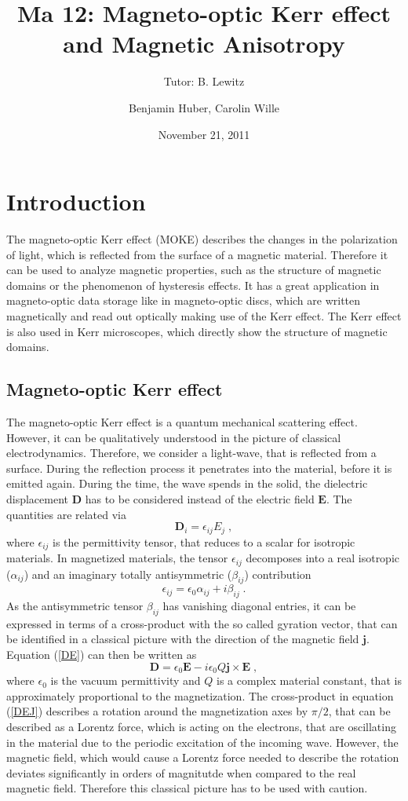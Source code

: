 \documentclass[a4paper]{scrartcl}
\title{Ma 12: Magneto-optic Kerr effect and Magnetic Anisotropy}
\subtitle{Tutor: B. Lewitz}
\author{Benjamin Huber, Carolin Wille}
\date{November 21, 2011}
\numberwithin{equation}{section}
\numberwithin{figure}{section}
\numberwithin{table}{section}
\newcommand{\eq}[2]{\begin{equation}#1\label{#2}\end{equation}}
\newcommand{\Formel}[1]{(\ref{#1})}
\newcommand{\ve}[1]{\mathbf{ #1} }
\begin{document}
\thispagestyle{empty}
\maketitle
\tableofcontents
\clearpage


\section{Introduction}
The magneto-optic Kerr effect (MOKE) describes the changes in the polarization of light, which is reflected from the surface of a magnetic material. Therefore it can be used to analyze magnetic properties, such as the structure of magnetic domains or the phenomenon of hysteresis effects. It has a great application in magneto-optic data storage like in magneto-optic discs, which are written magnetically and read out optically making use of the Kerr effect. The Kerr effect is also used in Kerr microscopes, which directly show the structure of magnetic domains.

\subsection{Magneto-optic Kerr effect}
The magneto-optic Kerr effect is a quantum mechanical scattering effect. However, it can be qualitatively understood in the picture of classical electrodynamics. Therefore, we consider a light-wave, that is reflected from a surface. During the reflection process it
 penetrates into the material, before it is emitted again. During the time, the wave spends in the solid, the dielectric displacement $\ve D $ has to be considered instead of the electric field $\ve E$. The quantities are related via
\eq{\ve D_i = \epsilon_{ij} E_j \;, } {DE}
where $ \epsilon_{ij}$ is the permittivity tensor, that reduces to a scalar for isotropic materials. In magnetized materials, the tensor $\epsilon_{ij}$ decomposes into a real isotropic ($\alpha_{ij}$) and an imaginary totally antisymmetric ($\beta_{ij}$) contribution
\eq{\epsilon_{ij} = \epsilon_0 \alpha_{ij} + i \beta_{ij} \; . }{eps}
As the antisymmetric tensor $\beta_{ij}$ has vanishing diagonal entries, it can be expressed in terms of a cross-product with the so called gyration vector, that can be identified in a classical picture with the direction of the magnetic field $\ve j$. Equation \Formel{DE} can then be written as
\eq{\ve D = \epsilon_0 \ve E - i \epsilon_0 Q \ve j \times \ve E \; , }{DEJ}
where $\epsilon_0$ is the vacuum permittivity and $Q$ is a complex material constant, that is approximately proportional to the magnetization. The cross-product in equation \Formel{DEJ} describes a rotation around the magnetization axes by $\pi/2$, that can be described as a Lorentz force, which is acting on the electrons, that are oscillating in the material due to the periodic excitation of the incoming wave. However, the magnetic field, which would cause a Lorentz force needed to describe the rotation deviates significantly in orders of magnitutde when compared to the real magnetic field. Therefore this classical picture has to be used with caution. 
\end{document}

